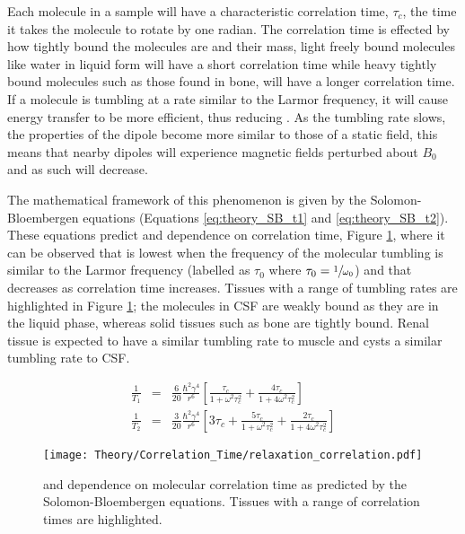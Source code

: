 Each molecule in a sample will have a characteristic correlation time, $\tau_c$, the time it takes the molecule to rotate by one radian. The correlation time is effected by how tightly bound the molecules are and their mass, light freely bound molecules like water in liquid form will have a short correlation time while heavy tightly bound molecules such as those found in bone, will have a longer correlation time. If a molecule is tumbling at a rate similar to the Larmor frequency, it will cause energy transfer to be more efficient, thus reducing \tone. As the tumbling rate slows, the properties of the dipole become more similar to those of a static field, this means that nearby dipoles will experience magnetic fields perturbed about $B_0$ and as such \ttwo will decrease.

\newpage
The mathematical framework of this phenomenon is given by the Solomon-Bloembergen equations \cite{solomon_relaxation_1955} (Equations \eqref{eq:theory_SB_t1} and \eqref{eq:theory_SB_t2}). These equations predict \tone and \ttwo dependence on correlation time, Figure \ref{fig:theory_relaxation_correlation}, where it can be observed that \tone is lowest when the frequency of the molecular tumbling is similar to the Larmor frequency (labelled as $\tau_0$ where $\tau_0=\sfrac{1}{\omega_0}$) and that \ttwo decreases as correlation time increases. Tissues with a range of tumbling rates are highlighted in Figure \ref{fig:theory_relaxation_correlation}; the molecules in \ac{CSF} are weakly bound as they are in the liquid phase, whereas solid tissues such as bone are tightly bound. Renal tissue is expected to have a similar tumbling rate to muscle and cysts a similar tumbling rate to \ac{CSF}.

\begin{eqnarray}
	\frac{1}{T_1}&=& \frac{6}{20}\frac{\hbar^2\gamma^4}{r^6}\left[ \frac{\tau_c}{1 + \omega^2\tau_c^2} + \frac{4\tau_c}{1 + 4\omega^2\tau_c^2}\right]
	\label{eq:theory_SB_t1}\\
	\frac{1}{T_2}&=& \frac{3}{20}\frac{\hbar^2\gamma^4}{r^6}\left[ 3\tau_c +  \frac{5\tau_c}{1 + \omega^2\tau_c^2} + \frac{2\tau_c}{1 + 4\omega^2\tau_c^2}\right]
	\label{eq:theory_SB_t2}
\end{eqnarray}
\begin{figure}[H]
	\centering
	\texttt{[image: Theory/Correlation\_Time/relaxation\_correlation.pdf]}
	\caption{\tone and \ttwo dependence on molecular correlation time as predicted by the Solomon-Bloembergen equations. Tissues with a range of correlation times are highlighted.}
	\label{fig:theory_relaxation_correlation}	
\end{figure}


